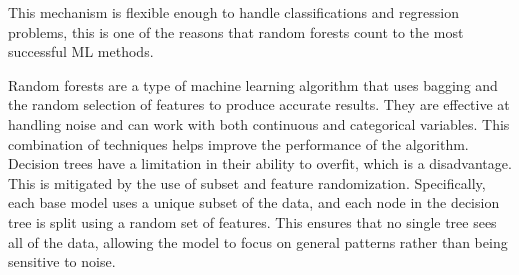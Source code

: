 This mechanism is flexible enough to handle classifications and regression problems, this is one of the reasons that
random forests count to the most successful \ac{ML} methods. \cite[p. 3-4]{biau_randomforestguided_2016} \cite[p.
25]{breiman_randomforests_2001}

%
%
Random forests are a type of machine learning algorithm that uses bagging and the random selection of features to
produce accurate results. They are effective at handling noise and can work with both continuous and categorical
variables. This combination of techniques helps improve the performance of the algorithm. \cite[p.
259]{liu_newmachinelearning_2012}
Decision trees have a limitation in their ability to overfit, which is a disadvantage. This is mitigated by the use
of subset and feature randomization. Specifically, each base model uses a unique subset of the data, and each node in
the decision tree is split using a random set of features. This ensures that no single tree sees all of the data,
allowing the model to focus on general patterns rather than being sensitive to noise. \cite[p.
259]{liu_newmachinelearning_2012}


%



%
%


